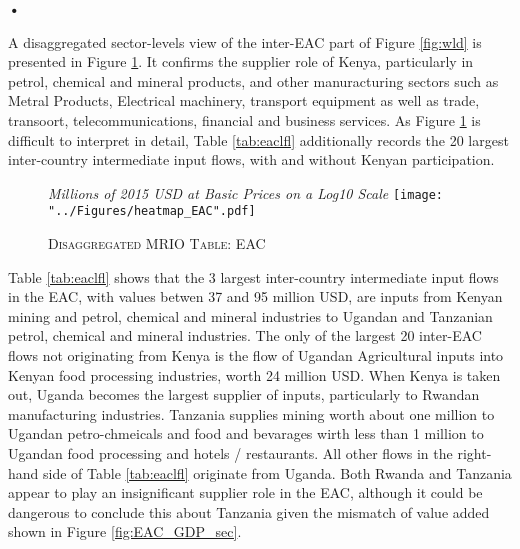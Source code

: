 \textbf{\textbf{•}}\documentclass[a4paper]{article}
\begin{document}
A disaggregated sector-levels view of the inter-EAC part of Figure \ref{fig:wld} is presented in Figure \ref{fig:eac}. It confirms the supplier role of Kenya, particularly in petrol, chemical and mineral products, and other manuracturing sectors such as Metral Products, Electrical machinery, transport equipment as well as trade, transoort, telecommunications, financial and business services. As Figure \ref{fig:eac} is difficult to interpret in detail, Table \ref{tab:eaclfl} additionally records the 20 largest inter-country intermediate input flows, with and without Kenyan participation.

\begin{figure}[h!]
\centering
\caption{\label{fig:eac}\textsc{Disaggregated MRIO Table: EAC}}
\small{\textit{Millions of 2015 USD at Basic Prices on a Log10 Scale}}
\texttt{[image: "../Figures/heatmap\_EAC".pdf]} %
\end{figure}
\FloatBarrier

Table \ref{tab:eaclfl} shows that the 3 largest inter-country intermediate input flows in the EAC, with values betwen 37 and 95 million USD, are inputs from Kenyan mining and petrol, chemical and mineral industries to Ugandan and Tanzanian petrol, chemical and mineral industries. The only of the largest 20 inter-EAC flows not originating from Kenya  is the flow of Ugandan Agricultural inputs into Kenyan food processing industries, worth 24 million USD. When Kenya is taken out, Uganda becomes the largest supplier of inputs, particularly to Rwandan manufacturing industries. Tanzania supplies mining worth about one million to Ugandan petro-chmeicals and food and bevarages wirth less than 1 million to Ugandan food processing and hotels / restaurants. All other flows in the right-hand side of Table \ref{tab:eaclfl} originate from Uganda. Both Rwanda and Tanzania appear to play an insignificant supplier role in the EAC, although it could be dangerous to conclude this about Tanzania given the mismatch of value added shown in Figure \ref{fig:EAC_GDP_sec}. 
\end{document}
